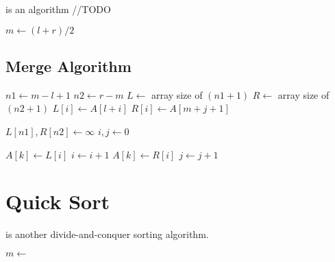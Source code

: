 \documentclass{report}
\begin{document}
 is an algorithm //TODO

\noindent \hrulefill
\begin{algorithmic}[1]
   
    \State $m \gets (l + r) / 2$
    \State {}
    \State {}
    \State {}
    \EndIf
  \State {}
  \EndFunction
\end{algorithmic}
\noindent \hrulefill

\subsection{Merge Algorithm}

\noindent \dotfill
\begin{algorithmic}[1]
   
    \State $n1 \gets m - l + 1$
    \State $n2 \gets r - m$
    \State $L \gets$ array size of $(n1 + 1)$
    \State $R \gets$ array size of $(n2 + 1)$
      \State $L[i] \gets A[l + i]$
    \EndFor
      \State $R[i] \gets A[m + j + 1]$
    \EndFor
    \item[]
    \State $L[n1], R[n2] \gets \infty$
    \State $i, j \gets 0$
    \item[]
        \State $A[k] \gets L[i]$
        \State $i \gets i + 1$
      \Else
        \State $A[k] \gets R[i]$
        \State $j \gets j + 1$
      \EndIf
    \EndFor
  \State {}
  \EndFunction
\end{algorithmic}
\noindent \dotfill

\section{Quick Sort}

 is another divide-and-conquer sorting algorithm.

\noindent \hrulefill
\begin{algorithmic}[0]
   
      \State $m \gets$ 
      \State {}
      \State {}
    \EndIf
    \State {}
  \EndFunction
\end{algorithmic}
\noindent \hrulefill
\end{document}
